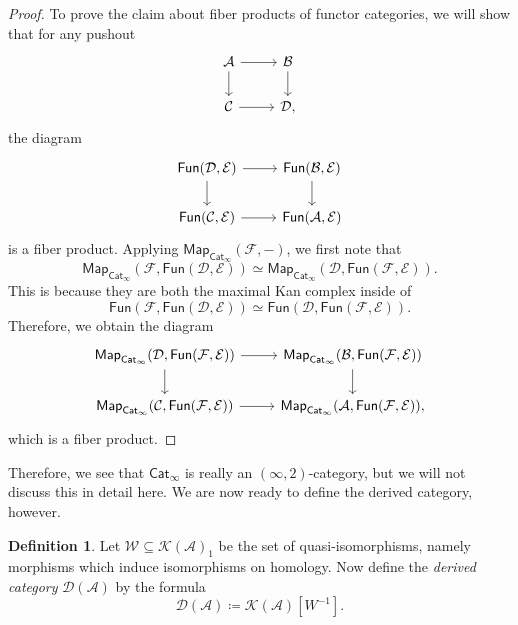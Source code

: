 \documentclass[10pt, oneside]{memoir}
\theoremstyle{definition}
\newtheorem{defn}[thm]{Definition}
\theoremstyle{remark}
\theoremstyle{plain}
\theoremstyle{definition}
\theoremstyle{remark}
\newcommand{\mc}[1]{\mathcal{#1}}
\newcommand{\ms}[1]{\mathsf{#1}}
\newcommand{\1}{\mathbf{1}}
\newcommand{\2}{\mathbf{2}}
\newcommand{\3}{\mathbf{3}}
\begin{document}
\begin{proof}
    To prove the claim about fiber products of functor categories, we will show that for any pushout
    \begin{equation*}
    \begin{tikzcd}
        \mc{A} \ar{r} \ar{d} & \mc{B} \ar{d} \\
        \mc{C} \ar{r} & \mc{D},
    \end{tikzcd}
    \end{equation*}
    the diagram
    \begin{equation*}
    \begin{tikzcd}
        \ms{Fun}(\mc{D}, \mc{E}) \ar{r} \ar{d} & \ms{Fun}(\mc{B}, \mc{E}) \ar{d} \\
        \ms{Fun}(\mc{C}, \mc{E}) \ar{r} & \ms{Fun}(\mc{A}, \mc{E})
    \end{tikzcd}
    \end{equation*}
    is a fiber product. Applying $\ms{Map}_{\ms{Cat}_{\infty}}(\mc{F}, -)$, we first note that
    \[ \ms{Map}_{\ms{Cat}_{\infty}}(\mc{F}, \ms{Fun}(\mc{D}, \mc{E})) \simeq \ms{Map}_{\ms{Cat}_{\infty}}(\mc{D}, \ms{Fun}(\mc{F}, \mc{E})). \]
    This is because they are both the maximal Kan complex inside of
    \[ \ms{Fun}(\mc{F}, \ms{Fun}(\mc{D}, \mc{E})) \simeq \ms{Fun}(\mc{D}, \ms{Fun}(\mc{F}, \mc{E})). \]
    Therefore, we obtain the diagram
    \begin{equation*}
    \begin{tikzcd}
        \ms{Map}_{\ms{Cat}_{\infty}}(\mc{D}, \ms{Fun}(\mc{F}, \mc{E})) \ar{r} \ar{d} & \ms{Map}_{\ms{Cat}_{\infty}}(\mc{B}, \ms{Fun}(\mc{F}, \mc{E}))  \ar{d} \\
        \ms{Map}_{\ms{Cat}_{\infty}}(\mc{C}, \ms{Fun}(\mc{F}, \mc{E})) \ar{r} & \ms{Map}_{\ms{Cat}_{\infty}}(\mc{A}, \ms{Fun}(\mc{F}, \mc{E})),
    \end{tikzcd}
    \end{equation*}
    which is a fiber product.
\end{proof}

Therefore, we see that $\ms{Cat}_{\infty}$ is really an $(\infty, 2)$-category, but we will not discuss this in detail here. We are now ready to define the derived category, however.

\begin{defn}
    Let $\mc{W} \subseteq \mc{K}(\mc{A})_1$ be the set of quasi-isomorphisms, namely morphisms which induce isomorphisms on homology. Now define the \textit{derived category} $\mc{D}(\mc{A})$ by the formula
    \[ \mc{D}(\mc{A}) \coloneqq \mc{K}(\mc{A})[W^{-1}]. \]
\end{defn}
\end{document}
